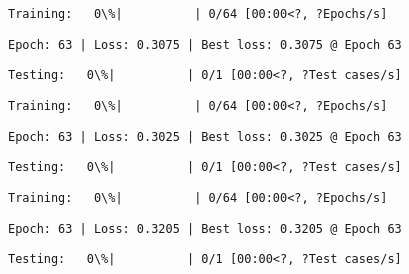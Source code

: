 \documentclass[11pt]{article}
\begin{document}
    
    
    \begin{Verbatim}[commandchars=\\\{\}]
Training:   0\%|          | 0/64 [00:00<?, ?Epochs/s]
    \end{Verbatim}

    
    \begin{Verbatim}[commandchars=\\\{\}]
Epoch: 63 | Loss: 0.3075 | Best loss: 0.3075 @ Epoch 63
    \end{Verbatim}

    
    \begin{Verbatim}[commandchars=\\\{\}]
Testing:   0\%|          | 0/1 [00:00<?, ?Test cases/s]
    \end{Verbatim}

    
    
    \begin{Verbatim}[commandchars=\\\{\}]
Training:   0\%|          | 0/64 [00:00<?, ?Epochs/s]
    \end{Verbatim}

    
    \begin{Verbatim}[commandchars=\\\{\}]
Epoch: 63 | Loss: 0.3025 | Best loss: 0.3025 @ Epoch 63
    \end{Verbatim}

    
    \begin{Verbatim}[commandchars=\\\{\}]
Testing:   0\%|          | 0/1 [00:00<?, ?Test cases/s]
    \end{Verbatim}

    
    
    \begin{Verbatim}[commandchars=\\\{\}]
Training:   0\%|          | 0/64 [00:00<?, ?Epochs/s]
    \end{Verbatim}

    
    \begin{Verbatim}[commandchars=\\\{\}]
Epoch: 63 | Loss: 0.3205 | Best loss: 0.3205 @ Epoch 63
    \end{Verbatim}

    
    \begin{Verbatim}[commandchars=\\\{\}]
Testing:   0\%|          | 0/1 [00:00<?, ?Test cases/s]
    \end{Verbatim}
\end{document}
